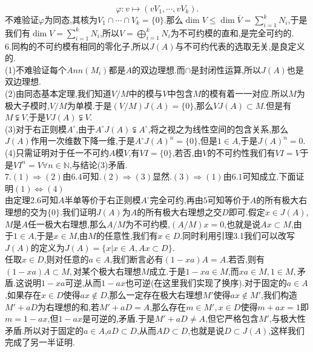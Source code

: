 \documentclass[b5paper]{ctexart}
\begin{document}
\[\varphi:v\mapsto (vV_1,\cdots,vV_k).\]
不难验证$\varphi$为同态,其核为$V_1\cap\cdots\cap V_k=\{0\}$.那么$\dim V\leq \dim \overline{V}=\sum_{i=1}^kN_i$,于是我们有$\dim V=\sum_{i=1}^kN_i$,所以$V=\bigoplus_{i=1}^kN_i$为不可约模的直和,是完全可约的.\\
6.同构的不可约模有相同的零化子,所以$J(A)$与不可约代表的选取无关,是良定义的.\\
(1)不难验证每个$Ann(M_i)$都是$A$的双边理想.而$\cap$是封闭性运算,所以$J(A)$也是双边理想.\\
(2)由同态基本定理,我们知道$V/M$中的模与$V$中包含$M$的模有着一一对应.所以$M$为极大子模时,$V/M$为单模.于是$(V/M)J(A)=\{0\}$,那么$VJ(A)\subset M.$但是有$M\subsetneqq V$,于是$VJ(A) \subsetneqq V$.\\
(3)对于右正则模$A^{\circ}$,由于$A^{\circ}J(A)\subsetneqq A^{\circ}$,将之视之为线性空间的包含关系,那么$J(A)$作用一次维数下降一维,于是$A^{\circ}J(A)^n=\{0\}$,但是$1\in A$,于是$J(A)^n=0$.\\
(4)只需证明对于任一不可约$A$模$V$,有$VI=\{0\}$,若否,由$V$的不可约性我们有$VI=V$于是$VI^n=V\forall n\in\mathbb{N}$,与结论(3)矛盾.\\
7.$(1)\Rightarrow (2)$由$6.4$可知.$(2)\Rightarrow (3)$显然.$(3)\Rightarrow (1)$由$6.1$可知成立.下面证明$(1)\Leftrightarrow (4)$\\
由定理2.6可知$A$半单等价于右正则模$A^{\circ}$完全可约,再由$5$可知等价于$A$的所有极大右理想的交为$\{0\}$.我们证明$J(A)$为$A$的所有极大右理想之交$D$即可.假定$x\in J(A)$,$M$是$A$任一极大右理想,那么$A/M$为不可约模,$(A/M)x=0$,也就是说$Ax\subset M$,由于$1\in
 A$,于是$x\in M$,由$M$的任意性,我们有$x\in D$.同时利用引理3.1我们可以改写$J(A)$的定义为$J(A)=\{x|x\in A,Ax\subset D\}$.\\
 任取$x\in D$,则对任意的$a\in A$,我们断言必有$(1-xa)A=A$.若否,则有$(1-xa)A\subset M,$对某个极大右理想$M$成立.于是$1-xa\in M$,而$xa\in M,1\in M,$矛盾.这说明$1-xa$可逆,从而$1-ax
 $也可逆(在这里我们实现了换序).对于固定的$a\in A$,如果存在$x\in D$使得$ax\not\in D$,那么一定存在极大右理想$M'$使得$ax\not\in M'$,我们构造$M'+aD$为右理想的和,若$M'+aD=A$,那么存在$m\in M',x\in D$使得$m+ax=1$即$m=1-ax$,但$1-ax$是可逆的,矛盾.于是$M'+aD\neq A$,但它严格包含$M'$,与极大性矛盾.所以对于固定的$a\in A$,$aD\subset D$,从而$AD \subset D$,也就是说$D\subset J(A)$,这样我们完成了另一半证明.
\end{document}
